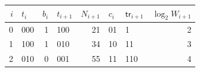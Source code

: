 \begin{tabular}{r l r l r l l r}%
\hline%
\textbf{$i$}&\textbf{$t_i$}&\textbf{$b_i$}&\textbf{$t_{i+1}$}&\textbf{$N_{i+1}$}&\textbf{$c_i$}&\textbf{$\mathsf{tr}_{i+1}$}&\textbf{$\log_2 W_{i+1}$}\\%
\hline%
0&000&1&100&21&01&1&2\\%
1&100&1&010&34&10&11&3\\%
2&010&0&001&55&11&110&4\\%
\hline%
\end{tabular}
